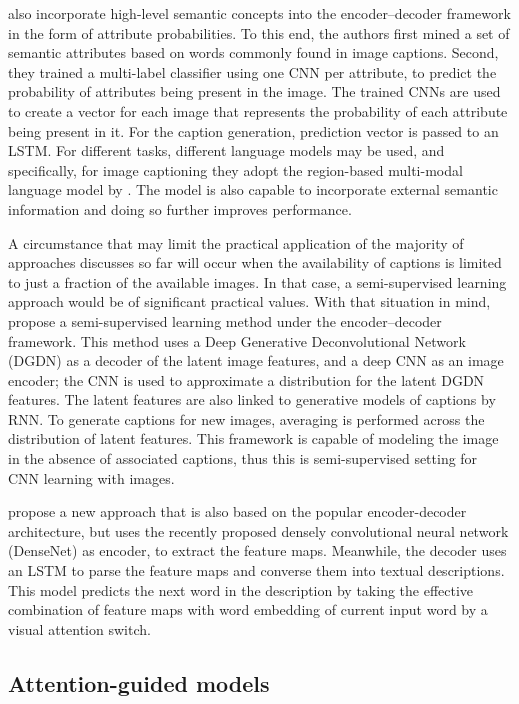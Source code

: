 \citet{Wu2015} also incorporate high-level semantic concepts into the encoder–decoder framework in the form of attribute probabilities. To this end, the authors first mined a set of semantic attributes based on words commonly found in image captions. Second, they trained a multi-label classifier using one CNN per attribute, to predict the probability of attributes being present in the image. The trained CNNs are used to create a vector for each image that represents the probability of each attribute being present in it. For the caption generation, prediction vector is passed to an LSTM. For different tasks, different language models may be used, and specifically, for image captioning they adopt the region-based multi-modal language model by \citet{Vinyals2015}. The model is also capable to incorporate external semantic information and doing so further improves performance.

A circumstance that may limit the practical application of the majority of approaches discusses so far will occur when the availability of captions is limited to just a fraction of the available images. In that case, a semi-supervised learning approach would be of significant practical values. With that situation in mind, \citet{Pu2016b} propose a semi-supervised learning method under the encoder–decoder framework. This method uses a Deep Generative Deconvolutional Network (DGDN) \citep{Pu2016a} as a decoder of the latent image features, and a deep CNN as an image encoder; the CNN is used to approximate a distribution for the latent DGDN features. The latent features are also linked to generative models of captions by RNN. To generate captions for new images, averaging is performed across the distribution of latent features. This framework is capable of modeling the image in the absence of associated captions, thus this is semi-supervised setting for CNN learning with images. 

\citet{Hao2018} propose a new approach that is also based on the popular encoder-decoder architecture, but uses the recently proposed densely convolutional neural network (DenseNet) as encoder, to extract the feature maps. Meanwhile, the decoder uses an LSTM to parse the feature maps and converse them into textual descriptions. This model predicts the next word in the description by taking the effective combination of feature maps with word embedding of current input word by a visual attention switch.

\subsection{Attention-guided models}

